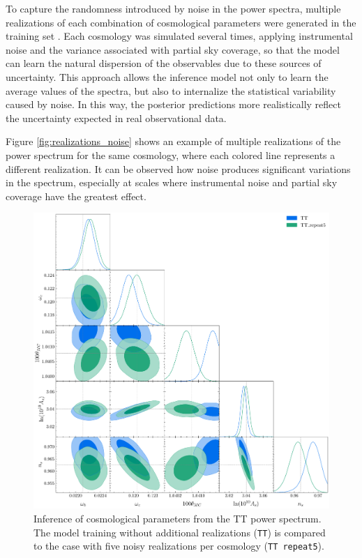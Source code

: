 To capture the randomness introduced by noise in the power spectra, multiple realizations of each combination of cosmological parameters were generated in the training set \cite{novaes}. Each cosmology was simulated several times, applying instrumental noise and the variance associated with partial sky coverage, so that the model can learn the natural dispersion of the observables due to these sources of uncertainty. This approach allows the inference model not only to learn the average values of the spectra, but also to internalize the statistical variability caused by noise. In this way, the posterior predictions more realistically reflect the uncertainty expected in real observational data.

Figure \ref{fig:realizations_noise} shows an example of multiple realizations of the power spectrum for the same cosmology, where each colored line represents a different realization. It can be observed how noise produces significant variations in the spectrum, especially at scales where instrumental noise and partial sky coverage have the greatest effect.

\begin{figure}
    \centering
    \includegraphics[scale=0.35]{img/01_repeat_noise_comparison_100000.pdf}
    \caption{Inference of cosmological parameters from the TT power spectrum. The model training without additional realizations (\texttt{TT}) is compared to the case with five noisy realizations per cosmology (\texttt{TT repeat5}).}
    \label{fig:inference_with_noise}
\end{figure}

